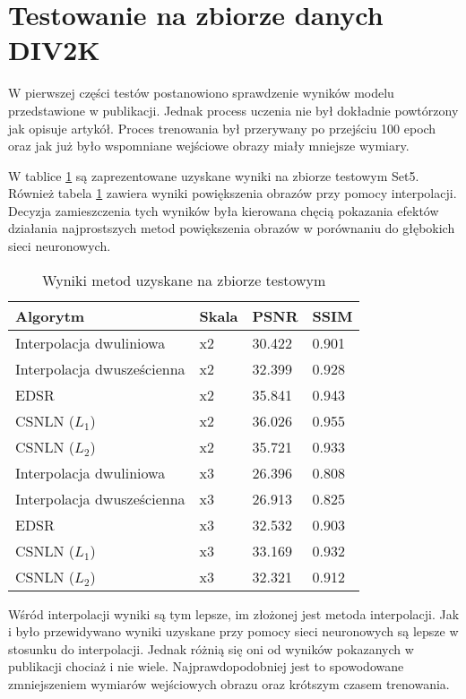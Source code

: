 \documentclass[a4paper,12pt,twoside,openany]{report}
\begin{document}
\section{Testowanie na zbiorze danych DIV2K}  
W pierwszej części testów postanowiono sprawdzenie wyników modelu przedstawione w publikacji. Jednak process uczenia nie był dokładnie powtórzony jak opisuje artykół. Proces trenowania był przerywany po  przejściu 100 epoch oraz jak już było wspomniane wejściowe obrazy miały  mniejsze wymiary.

W tablice \ref{TabelaDIV2k} są zaprezentowane uzyskane wyniki na zbiorze testowym Set5. Również tabela  \ref{TabelaDIV2k} zawiera wyniki powiększenia obrazów przy pomocy interpolacji. Decyzja zamieszczenia tych wyników była kierowana chęcią pokazania efektów działania najprostszych metod  powiększenia  obrazów w porównaniu do głębokich  sieci neuronowych. 

\begin{table}[!htbp] 
	\centering
\begin{tabular}{ |p{5cm}||p{2cm}|p{2cm}|p{2cm}|  }
	\hline
	Algorytm & Skala & PSNR &SSIM \\
	\hline
	Interpolacja dwuliniowa                   & x2   &30.422&  0.901\\
	Interpolacja dwusześcienna                & x2   &32.399&   0.928\\
	EDSR                                      &   x2   & 35.841&   0.943\\
	CSNLN  ($L_1$)  						  &   x2  & 36.026& 0.955\\
	CSNLN ($L_2$)  							  &   x2  & 35.721& 0.933\\
	\hline
	Interpolacja dwuliniowa                   &   x3  &26.396&   0.808\\
	Interpolacja dwusześcienna                &   x3  & 26.913   &0.825\\
	EDSR                                      &   x3 & 32.532 &  0.903\\
	CSNLN ($L_1$) 						      &   x3  & 33.169 & 0.932\\
	CSNLN ($L_2$)  							  &   x3  & 32.321 & 0.912\\
	\hline
	
\end{tabular}
\caption{Wyniki metod uzyskane na zbiorze testowym}
\label{TabelaDIV2k}
\end{table}

Wśród interpolacji wyniki są  tym lepsze, im złożonej jest metoda  interpolacji. Jak i było przewidywano wyniki uzyskane przy pomocy sieci neuronowych są lepsze w stosunku  do interpolacji. Jednak różnią się oni od wyników  pokazanych w publikacji chociaż i nie wiele. Najprawdopodobniej jest to spowodowane zmniejszeniem wymiarów wejściowych obrazu oraz krótszym czasem trenowania. 
\end{document}
